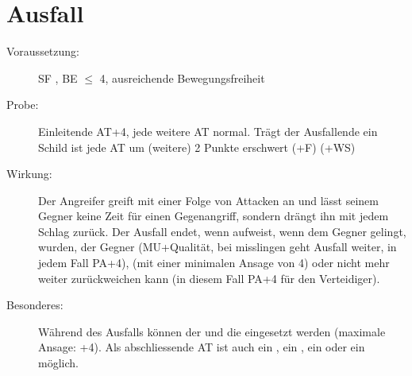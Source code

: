 \section{Ausfall}
\label{bAT.ausfall}
\begin{description}
    \item[Voraussetzung:]
        SF , BE \textrm{${\leq}$} 4, ausreichende Bewegungsfreiheit
    \item[Probe:]
        Einleitende AT+4, jede weitere AT normal.
        Trägt der Ausfallende ein Schild ist jede AT um (weitere) 2 Punkte erschwert (+F) (+WS)
    \item[Wirkung:]
        Der Angreifer greift mit einer Folge von Attacken an und lässt seinem Gegner keine Zeit für einen Gegenangriff, sondern drängt ihn mit jedem Schlag zurück.
        Der Ausfall endet, wenn  aufweist, wenn dem Gegner  gelingt,  wurden, der Gegner  (MU+Qualität, bei misslingen geht Ausfall weiter, in jedem Fall PA+4),  (mit einer minimalen Ansage von 4) oder nicht mehr weiter zurückweichen kann (in diesem Fall PA+4 für den Verteidiger).
    \item[Besonderes:]
        Während des Ausfalls können der  und die  eingesetzt werden (maximale Ansage: +4).
        Als abschliessende AT ist auch ein , ein , ein  oder ein  möglich.
\end{description}
